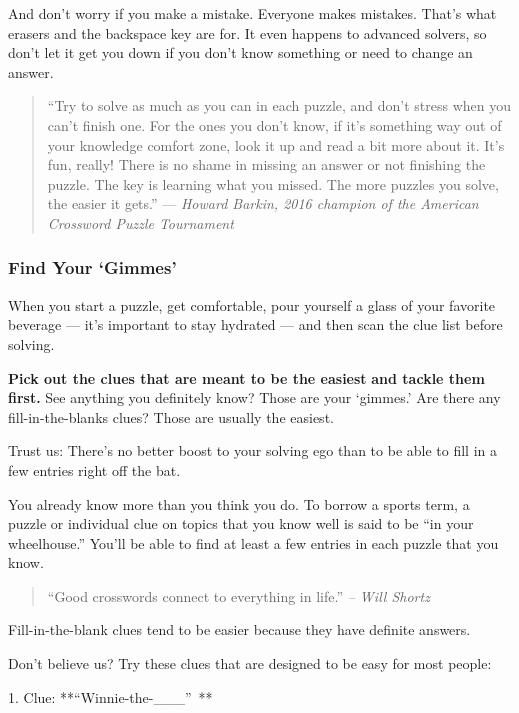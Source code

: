 And don't worry if you make a mistake. Everyone makes mistakes. That's
what erasers and the backspace key are for. It even happens to advanced
solvers, so don't let it get you down if you don't know something or
need to change an answer.~

\begin{quote}
``Try to solve as much as you can in each puzzle, and don't stress when
you can't finish one. For the ones you don't know, if it's something way
out of your knowledge comfort zone, look it up and read a bit more about
it. It's fun, really! There is no shame in missing an answer or not
finishing the puzzle. The key is learning what you missed. The more
puzzles you solve, the easier it gets.'' --- \emph{Howard Barkin, 2016
champion of the American Crossword Puzzle Tournament}
\end{quote}

\hypertarget{find-your-gimmes}{%
\subsubsection{Find Your `Gimmes'}\label{find-your-gimmes}}

When you start a puzzle, get comfortable, pour yourself a glass of your
favorite beverage --- it's important to stay hydrated --- and then scan
the clue list before solving.~

\textbf{Pick out the clues that are meant to be the easiest} \textbf{and
tackle them first.} See anything you definitely know? Those are your
`gimmes.' Are there any fill-in-the-blanks clues? Those are usually the
easiest.~

Trust us: There's no better boost to your solving ego than to be able to
fill in a few entries right off the bat.

You already know more than you think you do. To borrow a sports term, a
puzzle or individual clue on topics that you know well is said to be
``in your wheelhouse.'' You'll be able to find at least a few entries in
each puzzle that you know.

\begin{quote}
``Good crosswords connect to everything in life.'' \emph{-- Will Shortz}
\end{quote}

Fill-in-the-blank clues tend to be easier because they have definite
answers.~

Don't believe us? Try these clues that are designed to be easy for most
people:

1. Clue: **``Winnie-the-\_\_\_''~**

